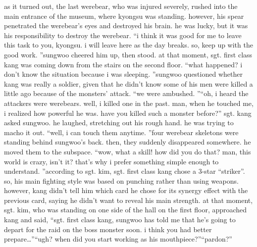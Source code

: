 as it turned out, the last werebear, who was injured severely, rushed into the main entrance of the museum, where kyongsu was standing.
however, his spear penetrated the werebear’s eyes and destroyed his brain.
 he was lucky, but it was his responsibility to destroy the werebear.
“i think it was good for me to leave this task to you, kyongsu.
 i will leave here as the day breaks.
 so, keep up with the good work.
”sungwoo cheered him up, then stood.
 at that moment, sgt.
 first class kang was coming down from the stairs on the second floor.
“what happened? i don’t know the situation because i was sleeping.
”sungwoo questioned whether kang was really a soldier, given that he didn’t know some of his men were killed a little ago because of the monsters’ attack.
“we were ambushed.
”“oh, i heard the attackers were werebears.
 well, i killed one in the past.
 man, when he touched me, i realized how powerful he was.
 have you killed such a monster before?” sgt.
 kang asked sungwoo.
he laughed, stretching out his rough hand.
 he was trying to macho it out.
“well, i can touch them anytime.
”four werebear skeletons were standing behind sungwoo’s back.
 then, they suddenly disappeared somewhere.
 he moved them to the subspace.
“wow, what a skill! how did you do that? man, this world is crazy, isn’t it? that’s why i prefer something simple enough to understand.
”according to sgt.
 kim, sgt.
 first class kang chose a 3-star “striker”.
 so, his main fighting style was based on punching rather than using weapons.
however, kang didn’t tell him which card he chose for its synergy effect with the previous card, saying he didn’t want to reveal his main strength.
at that moment, sgt.
 kim, who was standing on one side of the hall on the first floor, approached kang and said, “sgt.
 first class kang, sungwoo has told me that he’s going to depart for the raid on the boss monster soon.
 i think you had better prepare…”“ugh? when did you start working as his mouthpiece?”“pardon?”

 